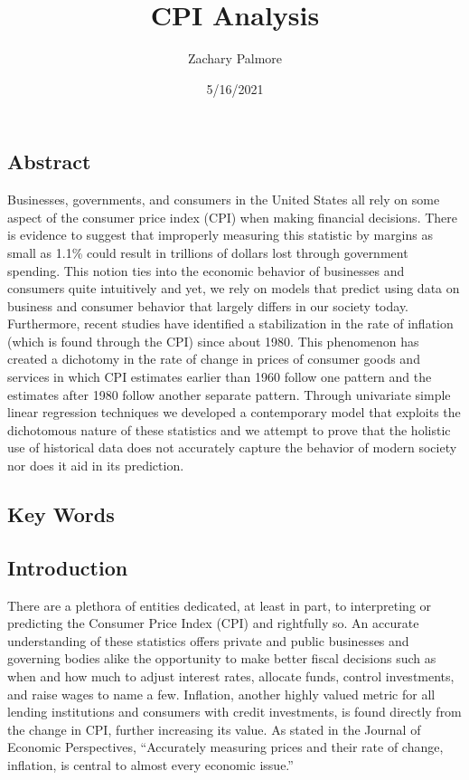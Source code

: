 \documentclass[
]{article}
\title{CPI Analysis}
\author{Zachary Palmore}
\date{5/16/2021}
\begin{document}
\maketitle

\hypertarget{abstract}{%
\subsection{Abstract}\label{abstract}}

Businesses, governments, and consumers in the United States all rely on
some aspect of the consumer price index (CPI) when making financial
decisions. There is evidence to suggest that improperly measuring this
statistic by margins as small as 1.1\% could result in trillions of
dollars lost through government spending. This notion ties into the
economic behavior of businesses and consumers quite intuitively and yet,
we rely on models that predict using data on business and consumer
behavior that largely differs in our society today. Furthermore, recent
studies have identified a stabilization in the rate of inflation (which
is found through the CPI) since about 1980. This phenomenon has created
a dichotomy in the rate of change in prices of consumer goods and
services in which CPI estimates earlier than 1960 follow one pattern and
the estimates after 1980 follow another separate pattern. Through
univariate simple linear regression techniques we developed a
contemporary model that exploits the dichotomous nature of these
statistics and we attempt to prove that the holistic use of historical
data does not accurately capture the behavior of modern society nor does
it aid in its prediction.

\hypertarget{key-words}{%
\subsection{Key Words}\label{key-words}}

\hypertarget{introduction}{%
\subsection{Introduction}\label{introduction}}

There are a plethora of entities dedicated, at least in part, to
interpreting or predicting the Consumer Price Index (CPI) and rightfully
so. An accurate understanding of these statistics offers private and
public businesses and governing bodies alike the opportunity to make
better fiscal decisions such as when and how much to adjust interest
rates, allocate funds, control investments, and raise wages to name a
few. Inflation, another highly valued metric for all lending
institutions and consumers with credit investments, is found directly
from the change in CPI, further increasing its value. As stated in the
Journal of Economic Perspectives, ``Accurately measuring prices and
their rate of change, inflation, is central to almost every economic
issue.''
\end{document}
